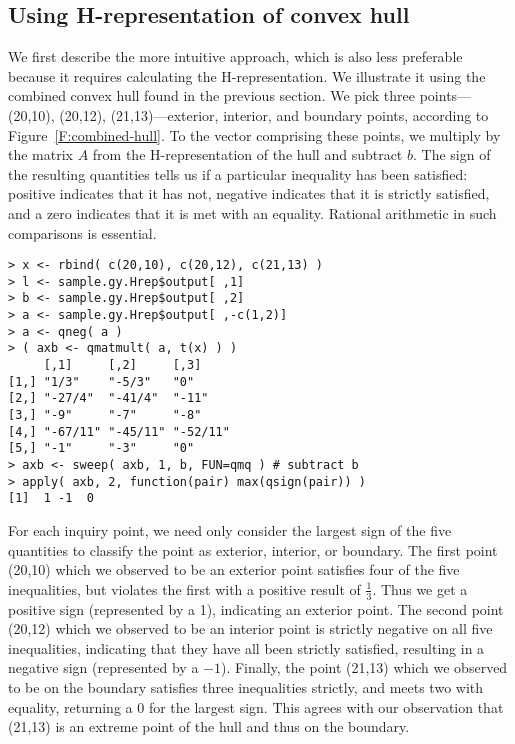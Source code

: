 \subsection{Using H-representation of convex hull}
\label{S:H-rep inquiry}
We first describe the more intuitive approach, which is also less preferable because 
it requires calculating the H-representation.  We illustrate it using the combined 
convex hull found in the previous section.
We pick three points---(20,10), (20,12), (21,13)---exterior, interior, and boundary 
points, according to Figure~\ref{F:combined-hull}.  
To the vector comprising these points, we multiply
 by the matrix $A$ from the H-representation of the hull 
 and subtract $b$.  The sign of the resulting quantities tells us if a 
 particular inequality has been satisfied: positive indicates that it has not, 
 negative indicates that it is strictly satisfied, and a zero indicates that it is
 met with an equality.  Rational arithmetic in such comparisons is essential.
{ \singlespace
\begin{verbatim}
> x <- rbind( c(20,10), c(20,12), c(21,13) )
> l <- sample.gy.Hrep$output[ ,1]
> b <- sample.gy.Hrep$output[ ,2]
> a <- sample.gy.Hrep$output[ ,-c(1,2)]
> a <- qneg( a )
> ( axb <- qmatmult( a, t(x) ) )
     [,1]     [,2]     [,3]    
[1,] "1/3"    "-5/3"   "0"     
[2,] "-27/4"  "-41/4"  "-11"   
[3,] "-9"     "-7"     "-8"    
[4,] "-67/11" "-45/11" "-52/11"
[5,] "-1"     "-3"     "0"     
> axb <- sweep( axb, 1, b, FUN=qmq ) # subtract b
> apply( axb, 2, function(pair) max(qsign(pair)) )
[1]  1 -1  0
\end{verbatim}
}
For each inquiry point, we need only consider the largest sign of the five quantities
to classify the point as exterior, interior, or boundary.
 The first point (20,10) which we observed to be an exterior point 
 satisfies four of the five inequalities, but violates the first with
 a positive result of $\frac{1}{3}$.  Thus we get a positive sign (represented by a 1), 
 indicating an exterior point.  The second point (20,12) which we observed to be an 
 interior point is strictly negative on all five inequalities, indicating that they 
 have all been strictly satisfied, resulting in a negative sign
 (represented by a $-1$).  Finally, the point (21,13) which we observed to 
 be on the boundary satisfies three inequalities 
 strictly, and meets two with equality, returning a 0 for the largest sign.  
 This agrees with our observation 
 that (21,13) is an extreme point of the hull and thus on the boundary.


